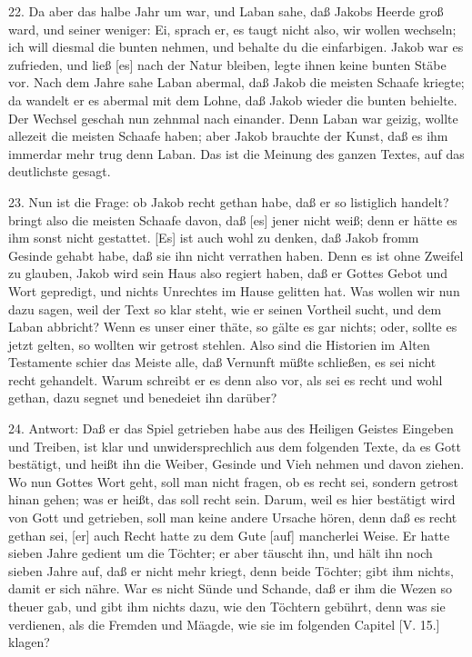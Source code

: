 22. Da aber das halbe Jahr um war, und Laban sahe, daß Jakobs Heerde groß ward, und seiner weniger: Ei, sprach er, es taugt nicht also, wir wollen wechseln; ich will diesmal die bunten nehmen, und behalte du die einfarbigen. Jakob war es zufrieden, und ließ [es] nach der Natur bleiben, legte ihnen keine bunten Stäbe vor. Nach dem Jahre sahe Laban abermal, daß Jakob die meisten Schaafe kriegte; da wandelt er es abermal mit dem Lohne, daß Jakob wieder die bunten behielte. Der Wechsel geschah nun zehnmal nach einander. Denn Laban war geizig, wollte allezeit die meisten Schaafe haben; aber Jakob brauchte der Kunst, daß es ihm immerdar mehr trug denn Laban. Das ist die Meinung des ganzen Textes, auf das deutlichste gesagt.

23. Nun ist die Frage: ob Jakob recht gethan habe, daß er so listiglich handelt? bringt also die meisten Schaafe davon, daß [es] jener nicht weiß; denn er hätte es ihm sonst nicht gestattet. [Es] ist auch wohl zu denken, daß Jakob fromm Gesinde gehabt habe, daß sie ihn nicht verrathen haben. Denn es ist ohne Zweifel zu glauben, Jakob wird sein Haus also regiert haben, daß er Gottes Gebot und Wort gepredigt, und nichts Unrechtes im Hause gelitten hat. Was wollen wir nun dazu sagen, weil der Text so klar steht, wie er seinen Vortheil sucht, und dem Laban
abbricht? Wenn es unser einer thäte, so gälte es gar nichts; oder, sollte es jetzt gelten, so wollten wir getrost stehlen. Also sind die Historien im Alten Testamente schier das Meiste alle, daß Vernunft müßte schließen, es sei nicht recht gehandelt. Warum schreibt er es denn also vor, als sei es recht und wohl gethan, dazu segnet und benedeiet ihn darüber?

24. Antwort: Daß er das Spiel getrieben habe aus des Heiligen Geistes Eingeben und Treiben, ist klar und unwidersprechlich aus dem folgenden Texte, da es Gott bestätigt, und heißt ihn die Weiber, Gesinde und Vieh nehmen und davon ziehen. Wo nun Gottes Wort geht, soll man nicht fragen, ob es recht sei, sondern getrost hinan gehen; was er heißt, das soll recht sein. Darum, weil es hier bestätigt wird von Gott und getrieben, soll man keine andere Ursache hören, denn daß es recht gethan sei, [er] auch Recht hatte zu dem Gute [auf] mancherlei Weise. Er hatte sieben Jahre gedient um die Töchter; er aber täuscht ihn, und hält ihn noch sieben Jahre auf, daß er nicht mehr kriegt, denn beide Töchter; gibt ihm nichts, damit er sich nähre. War es nicht Sünde und Schande, daß er ihm die Wezen so theuer gab, und gibt ihm nichts dazu, wie den Töchtern gebührt, denn was sie verdienen, als die Fremden und Mäagde, wie sie im folgenden Capitel [V. 15.] klagen?

